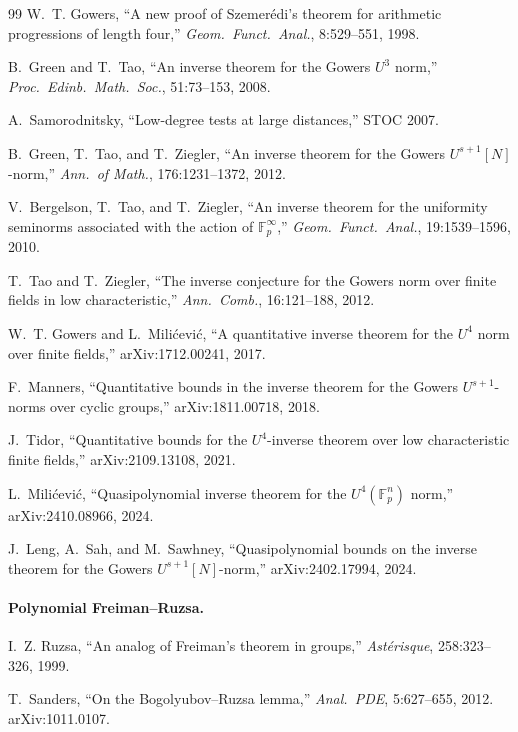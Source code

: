 \documentclass[11pt,a4paper]{article}
\theoremstyle{plain}
\theoremstyle{definition}
\theoremstyle{remark}
\newcommand{\F}{\mathbb{F}}
\begin{document}
\begin{thebibliography}{99}
W.~T. Gowers, ``A new proof of Szemer\'edi's theorem for arithmetic progressions of length four,'' \emph{Geom.\ Funct.\ Anal.}, 8:529--551, 1998.

B.~Green and T.~Tao, ``An inverse theorem for the Gowers $U^3$ norm,'' \emph{Proc.\ Edinb.\ Math.\ Soc.}, 51:73--153, 2008.

A.~Samorodnitsky, ``Low-degree tests at large distances,'' STOC 2007.

B.~Green, T.~Tao, and T.~Ziegler, ``An inverse theorem for the Gowers $U^{s+1}[N]$-norm,'' \emph{Ann.\ of Math.}, 176:1231--1372, 2012.

V.~Bergelson, T.~Tao, and T.~Ziegler, ``An inverse theorem for the uniformity seminorms associated with the action of $\F_p^\infty$,'' \emph{Geom.\ Funct.\ Anal.}, 19:1539--1596, 2010.

T.~Tao and T.~Ziegler, ``The inverse conjecture for the Gowers norm over finite fields in low characteristic,'' \emph{Ann.\ Comb.}, 16:121--188, 2012.

W.~T. Gowers and L.~Mili\'cevi\'c, ``A quantitative inverse theorem for the $U^4$ norm over finite fields,'' arXiv:1712.00241, 2017.

F.~Manners, ``Quantitative bounds in the inverse theorem for the Gowers $U^{s+1}$-norms over cyclic groups,'' arXiv:1811.00718, 2018.

J.~Tidor, ``Quantitative bounds for the $U^4$-inverse theorem over low characteristic finite fields,'' arXiv:2109.13108, 2021.

L.~Mili\'cevi\'c, ``Quasipolynomial inverse theorem for the $U^4(\F_p^n)$ norm,'' arXiv:2410.08966, 2024.

J.~Leng, A.~Sah, and M.~Sawhney, ``Quasipolynomial bounds on the inverse theorem for the Gowers $U^{s+1}[N]$-norm,'' arXiv:2402.17994, 2024.

\paragraph{Polynomial Freiman--Ruzsa.}

I.~Z. Ruzsa, ``An analog of Freiman's theorem in groups,'' \emph{Ast\'erisque}, 258:323--326, 1999.

T.~Sanders, ``On the Bogolyubov--Ruzsa lemma,'' \emph{Anal.\ PDE}, 5:627--655, 2012. arXiv:1011.0107.


\end{thebibliography}
\end{document}
